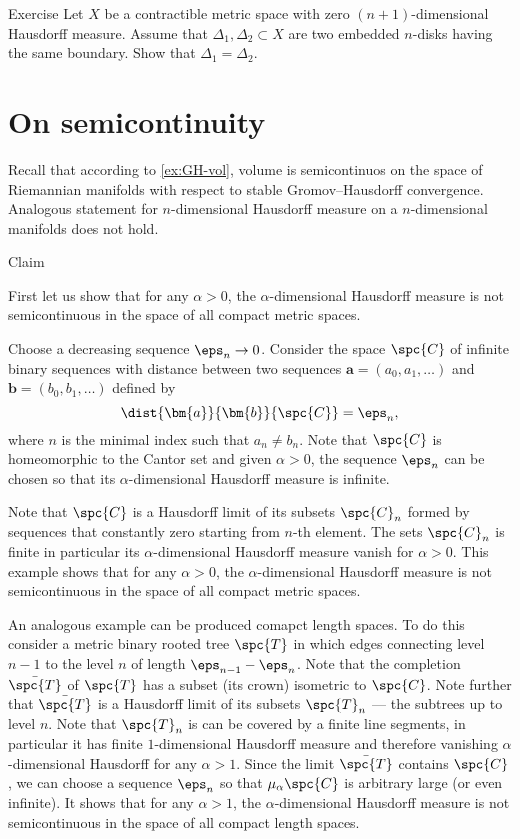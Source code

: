 \begin{thm}{Exercise}\label{}
Let $X$ be a contractible metric space with zero $(n+1)$-dimensional Hausdorff measure.
Assume that $\Delta_1,\Delta_2\subset X$ are two embedded $n$-disks having the same boundary.
Show that $\Delta_1=\Delta_2$.
\end{thm}

\section{On semicontinuity}

Recall that according to \ref{ex:GH-vol}, volume is semicontinuos on the space of Riemannian manifolds with respect to stable Gromov--Hausdorff convergence.
Analogous statement for $n$-dimensional Hausdorff measure on a $n$-dimensional manifolds does not hold.

\begin{thm}{Claim}
 
\end{thm}

First let us show that for any $\alpha>0$, the $\alpha$-dimensional Hausdorff measure is not semicontinuous in the space of all compact metric spaces.

Choose a decreasing sequence $\eps_n\to 0$.
Consider the space $\spc{C}$ of infinite binary sequences with distance between two sequences $\bm{a}=(a_0,a_1,\dots)$ and $\bm{b}=(b_0,b_1,\dots)$ defined by 
\[\dist{\bm{a}}{\bm{b}}{\spc{C}}=\eps_n,\]
where $n$ is the minimal index such that $a_n\ne b_n$.
Note that $\spc{C}$ is homeomorphic to the Cantor set and 
given $\alpha>0$,
the sequence $\eps_n$ can be chosen so that its $\alpha$-dimensional Hausdorff measure is infinite.

Note that $\spc{C}$ is a Hausdorff limit of its subsets $\spc{C}_n$ formed by sequences that constantly zero starting from $n$-th element.
The sets $\spc{C}_n$ is finite in particular its $\alpha$-dimensional Hausdorff measure vanish for $\alpha>0$.
This example shows that for any $\alpha>0$, the $\alpha$-dimensional Hausdorff measure is not semicontinuous in the space of all compact metric spaces.

An analogous example can be produced comapct length spaces.
To do this consider a metric binary rooted tree $\spc{T}$ in which edges connecting level $n-1$ to the level $n$ of length $\eps_{n-1}-\eps_n$.
Note that the completion $\bar{\spc{T}}$ of $\spc{T}$ has a subset (its crown) isometric to $\spc{C}$.
Note further that $\bar{\spc{T}}$ is a Hausdorff limit of its subsets $\spc{T}_n$ --- the subtrees up to level $n$.
Note that $\spc{T}_n$ is can be covered by a finite line segments, in particular it has finite $1$-dimensional Hausdorff measure and therefore vanishing $\alpha$-dimensional Hausdorff for any $\alpha>1$.
Since the limit $\bar{\spc{T}}$ contains $\spc{C}$, we can choose a sequence $\eps_n$ so that $\mu_\alpha\spc{C}$ is arbitrary large (or even infinite).
It shows that for any $\alpha>1$, the $\alpha$-dimensional Hausdorff measure is not semicontinuous in the space of all compact length spaces.

